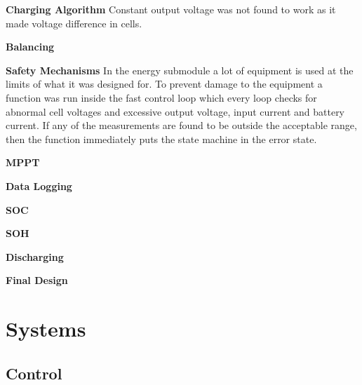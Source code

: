 \documentclass[a4paper]{article}
\begin{document}
\textbf{Charging Algorithm}
\vspace{10pt} 
\newline
Constant output voltage was not found to work as it made voltage difference in cells.

\textbf{Balancing}
\vspace{10pt} 
\newline

\textbf{Safety Mechanisms}
\vspace{10pt} 
\newline
In the energy submodule a lot of equipment is used at the limits of what it was designed for.
To prevent damage to the equipment a function was run inside the fast control loop
which every loop checks for abnormal cell voltages and excessive output voltage, input
current and battery current. If any of the measurements are found to be outside the
acceptable range, then the function immediately puts the state machine in the error
state.

\textbf{MPPT}
\vspace{10pt} 
\newline

\textbf{Data Logging}
\vspace{10pt} 
\newline

\textbf{SOC}
\vspace{10pt} 
\newline

\textbf{SOH}
\vspace{10pt} 
\newline

\textbf{Discharging}
\vspace{10pt} 
\newline

\textbf{Final Design}
\vspace{10pt} 
\newline











\section{Systems}

\subsection{Control}
 
\end{document}
